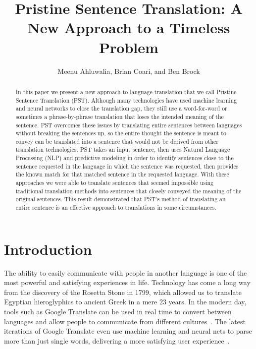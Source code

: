 \documentclass[runningheads]{llncs}
\title{Pristine Sentence Translation: A New Approach to a Timeless Problem}
\author{
	Meenu Ahluwalia, Brian Coari, and Ben Brock
}
\institute{$^1$Master of Science in Data Science \\ Southern Methodist University \\ Dallas, Texas USA \\
	\email{\{mahluwalia, bcoari, bbrock\}@smu.edu}}
\begin{document}
	
	\maketitle
	
	\begin{abstract}
		In this paper we present a new approach to language translation that we call Pristine Sentence Translation (PST). Although many technologies have used machine learning and neural networks to close the translation gap, they still use a word-for-word or sometimes a phrase-by-phrase translation that loses the intended meaning of the sentence. PST overcomes these issues by translating entire sentences between languages without breaking the sentences up, so the entire thought the sentence is meant to convey can be translated into a sentence that would not be derived from other translation technologies. PST takes an input sentence, then uses Natural Language Processing (NLP) and predictive modeling in order to identify sentences close to the sentence requested in the language in which the sentence was requested, then provides the known match for that matched sentence in the requested language. With these approaches we were able to translate sentences that seemed impossible using traditional translation methods into sentences that closely conveyed the meaning of the original sentences. This result demonstrated that PST's method of translating an entire sentence is an effective approach to translations in some circumstances.
		
	\end{abstract}
	
	
	\section{Introduction}
	
	The ability to easily communicate with people in another language is one of the most powerful and satisfying experiences in life. Technology has come a long way from the discovery of the Rosetta Stone in 1799, which allowed us to translate Egyptian hieroglyphics to ancient Greek in a mere 23 years. In the modern day, tools such as Google Translate can be used in real time to convert between languages and allow people to communicate from different cultures~\cite{ref_url6}. The latest iterations of Google Translate even use machine learning and neural nets to parse more than just  single words, delivering a more satisfying user experience~\cite{ref_url7}.
	
\end{document}
